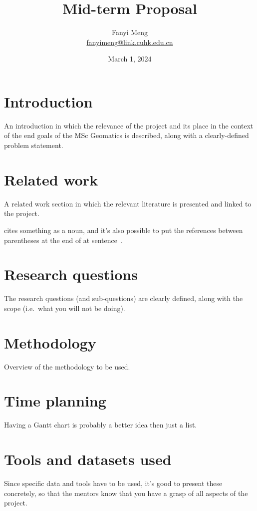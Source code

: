 \documentclass[a4paper,11pt]{scrartcl}
\title{Mid-term Proposal}
\author{Fanyi Meng \\ \url{fanyimeng@link.cuhk.edu.cn}}
\date{March 1, 2024}
\newcommand{\ie}{i.e.}
\begin{document}
\maketitle


%
\section{Introduction}
An introduction in which the relevance of the project and its place in the context of the end goals of the MSc Geomatics is described, along with a clearly-defined problem statement.

%
\section{Related work}
A related work section in which the relevant literature is presented and linked to the project.

\citet{Delaunay34} cites something as a noun, and it's also possible to put the references between parentheses at the end of at sentence~\citep{Voronoi08}.

%
\section{Research questions}
The research questions (and sub-questions) are clearly defined, along with the scope (\ie\ what you will not be doing).


%
\section{Methodology}
Overview of the methodology to be used.

%
\section{Time planning}
Having a Gantt chart is probably a better idea then just a list.

%
\section{Tools and datasets used}
Since specific data and tools have to be used, it’s good to present these concretely, so that the mentors know that you have a grasp of all aspects of the project.




\end{document}
